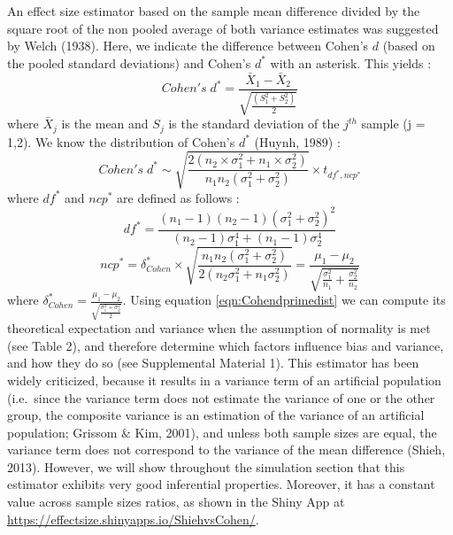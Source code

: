 \documentclass[
  english,
  man,floatsintext]{apa6}
\begin{document}
An effect size estimator based on the sample mean difference divided by the square root of the non pooled average of both variance estimates was suggested by Welch (1938). Here, we indicate the difference between Cohen's \(d\) (based on the pooled standard deviations) and Cohen's \(d^*\) with an asterisk. This yields :
\begin{equation*} 
Cohen's \; d^* = \frac{\bar{X}_{1} - \bar{X}_{2}}{ \sqrt{\frac{\left(S^2_{1}+S^2_{2} \right)}{2}}}
\label{eqn:Cohenprimeds}
\end{equation*}
where \(\bar{X}_{j}\) is the mean and \(S_j\) is the standard deviation of the \(j^{th}\) sample (j = 1,2). We know the distribution of Cohen's \(d^*\) (Huynh, 1989) :
\begin{equation} 
Cohen's \; d^* \sim  \sqrt{\frac{2(n_2\times\sigma^2_1+n_1\times\sigma^2_2)}{n_1n_2(\sigma^2_1+\sigma^2_2)}} \times t_{df^*,ncp^*}
\label{eqn:Cohendprimedist}
\end{equation}
where \(df^*\) and \(ncp^*\) are defined as follows :
\begin{equation} 
df^* = \frac{(n_1-1)(n_2-1)(\sigma^2_1+\sigma^2_2)^2}{(n_2-1)\sigma^4_1+(n_1-1)\sigma^4_2}
\label{eqn:Cohendprimedf}
\end{equation}
\begin{equation*} 
ncp^*=\delta^*_{Cohen} \times \sqrt{\frac{n_1n_2(\sigma^2_1+\sigma^2_2)}{2(n_2\sigma^2_1+n_1\sigma^2_2)}}=\frac{\mu_1-\mu_2}{\sqrt{\frac{\sigma_1^2}{n_1}+\frac{\sigma^2_2}{n_2}}}
\label{eqn:Cohendprimevst}
\end{equation*}
where \(\delta^*_{Cohen}=\frac{\mu_1-\mu_2}{\sqrt{\frac{\sigma^2_1+\sigma^2_2}{2}}}\). Using equation \ref{eqn:Cohendprimedist} we can compute its theoretical expectation and variance when the assumption of normality is met (see Table 2), and therefore determine which factors influence bias and variance, and how they do so (see Supplemental Material 1). This estimator has been widely criticized, because it results in a variance term of an artificial population (i.e.~since the variance term does not estimate the variance of one or the other group, the composite variance is an estimation of the variance of an artificial population; Grissom \(\&\) Kim, 2001), and unless both sample sizes are equal, the variance term does not correspond to the variance of the mean difference (Shieh, 2013). However, we will show throughout the simulation section that this estimator exhibits very good inferential properties. Moreover, it has a constant value across sample sizes ratios, as shown in the Shiny App at \url{https://effectsize.shinyapps.io/ShiehvsCohen/}.
\end{document}
